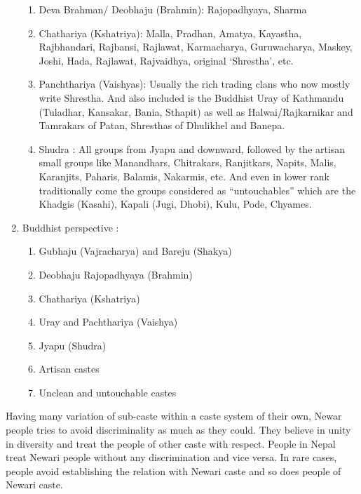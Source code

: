 \documentclass[a4paper,13pt, margin=0.9in]{article}
\begin{document}
\begin{flushleft}
\begin{enumerate}
		      \begin{enumerate}


			      \item Deva Brahman/ Deobhaju (Brahmin): Rajopadhyaya, Sharma
			      \item Chathariya (Kshatriya): Malla, Pradhan, Amatya, Kayastha, Rajbhandari, Rajbansi, Rajlawat, Karmacharya,  Guruwacharya, Maskey, Joshi, Hada, Rajlawat, Rajvaidhya, original ‘Shrestha’, etc.
			      \item Panchthariya (Vaishyas): Usually the rich trading clans who now mostly write Shrestha. And also included is the Buddhist Uray of Kathmandu (Tuladhar, Kansakar, Bania, Sthapit) as well as Halwai/Rajkarnikar and Tamrakars of Patan, Shresthas of Dhulikhel and Banepa.
			      \item Shudra : All groups from Jyapu and downward, followed by the artisan small groups like Manandhars, Chitrakars, Ranjitkars, Napits, Malis, Karanjits, Paharis, Balamis, Nakarmis, etc. And even in lower rank traditionally come the groups considered as “untouchables” which are the Khadgis (Kasahi), Kapali (Jugi, Dhobi), Kulu, Pode, Chyames.

		      \end{enumerate}
		\item  Buddhist perspective :

		      \begin{enumerate}



			      \item Gubhaju (Vajracharya) and Bareju (Shakya)
			      \item Deobhaju Rajopadhyaya (Brahmin)
			      \item Chathariya (Kshatriya)
			      \item Uray and Pachthariya (Vaishya)
			      \item Jyapu (Shudra)
			      \item Artisan castes
			      \item Unclean and untouchable castes

		      \end{enumerate}

	\end{enumerate}

	Having many variation of sub-caste within a caste system of their own, Newar people tries to avoid discriminality as much as they could. They believe in unity in diversity and treat the people of other caste with respect. People in Nepal treat Newari people without any discrimination and vice versa. In rare cases, people avoid establishing the relation with Newari caste and so does people of Newari caste.


\end{flushleft}
\end{document}

